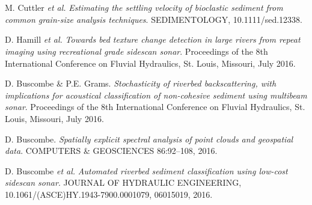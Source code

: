 \documentclass{article} %
\def\sf{\sffamily}
\def\sl{\slshape}
\newlength\sidebarwidth
\newcommand{\subtopic}[3][]
	 {\begin{minipage}{\textwidth}
	 \vspace*{.4\baselineskip}
         \nopagebreak\hspace{0in}%
         \nopagebreak\begin{minipage}[t]{\sidebarwidth - .2cm}
         \raggedleft {\sf\fontseries{sbc}\selectfont #2}
         {\\[-0.2\baselineskip] \textcolor{gray}{\footnotesize #1}}
	 \end{minipage}%
	 \hfill
	 \begin{minipage}[t]{\linewidth - \sidebarwidth}
	 #3%
	 \end{minipage}%
	 \vspace*{.2\baselineskip plus 1\baselineskip minus
	 .2\baselineskip}%
	 \end{minipage}}
\begin{document}
\subtopic{\hspace*{-3ex} 2016}{~
  \begin{itemize}[leftmargin=0ex, itemsep=0ex, parsep=.5ex, labelindent=-4ex]

    \publication
      M. Cuttler {\sl et al.}
      {\sl Estimating the settling velocity of bioclastic sediment from common grain-size analysis techniques}.
      SEDIMENTOLOGY, 10.1111/sed.12338.

    \publication
      D. Hamill {\sl et al.}
      {\sl Towards bed texture change detection in large rivers from repeat imaging using recreational grade sidescan sonar}.
      Proceedings of the 8th International Conference on Fluvial Hydraulics, St. Louis, Missouri, July 2016.

    \publication
      D. Buscombe \& P.E. Grams.
      {\sl Stochasticity of riverbed backscattering, with implications for acoustical classification of non-cohesive sediment using multibeam sonar}.
      Proceedings of the 8th International Conference on Fluvial Hydraulics, St. Louis, Missouri, July 2016.

    \publication
      D. Buscombe.
      {\sl Spatially explicit spectral analysis of point clouds and geospatial data}.
      COMPUTERS \& GEOSCIENCES 86:92--108, 2016.

    \publication
      D. Buscombe {\sl et al.}
      {\sl Automated riverbed sediment classification using low-cost sidescan sonar}.
      JOURNAL OF HYDRAULIC ENGINEERING, 10.1061/(ASCE)HY.1943-7900.0001079, 06015019, 2016.

    \end{itemize}
}
\end{document}
